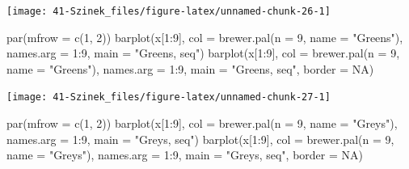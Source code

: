 \documentclass[
]{book}
\newenvironment{Shaded}{\begin{snugshade}}{\end{snugshade}}
\newcommand{\AttributeTok}[1]{\textcolor[rgb]{0.77,0.63,0.00}{#1}}
\newcommand{\ConstantTok}[1]{\textcolor[rgb]{0.00,0.00,0.00}{#1}}
\newcommand{\DecValTok}[1]{\textcolor[rgb]{0.00,0.00,0.81}{#1}}
\newcommand{\FunctionTok}[1]{\textcolor[rgb]{0.00,0.00,0.00}{#1}}
\newcommand{\NormalTok}[1]{#1}
\newcommand{\SpecialCharTok}[1]{\textcolor[rgb]{0.00,0.00,0.00}{#1}}
\newcommand{\StringTok}[1]{\textcolor[rgb]{0.31,0.60,0.02}{#1}}
\begin{document}
\begin{center}\texttt{[image: 41-Szinek\_files/figure-latex/unnamed-chunk-26-1]} \end{center}

\begin{Shaded}
\begin{Highlighting}[]
\FunctionTok{par}\NormalTok{(}\AttributeTok{mfrow =} \FunctionTok{c}\NormalTok{(}\DecValTok{1}\NormalTok{, }\DecValTok{2}\NormalTok{))}
\FunctionTok{barplot}\NormalTok{(x[}\DecValTok{1}\SpecialCharTok{:}\DecValTok{9}\NormalTok{], }\AttributeTok{col =} \FunctionTok{brewer.pal}\NormalTok{(}\AttributeTok{n =} \DecValTok{9}\NormalTok{, }\AttributeTok{name =} \StringTok{"Greens"}\NormalTok{), }\AttributeTok{names.arg =} \DecValTok{1}\SpecialCharTok{:}\DecValTok{9}\NormalTok{, }\AttributeTok{main =} \StringTok{"Greens, seq"}\NormalTok{)}
\FunctionTok{barplot}\NormalTok{(x[}\DecValTok{1}\SpecialCharTok{:}\DecValTok{9}\NormalTok{], }\AttributeTok{col =} \FunctionTok{brewer.pal}\NormalTok{(}\AttributeTok{n =} \DecValTok{9}\NormalTok{, }\AttributeTok{name =} \StringTok{"Greens"}\NormalTok{), }\AttributeTok{names.arg =} \DecValTok{1}\SpecialCharTok{:}\DecValTok{9}\NormalTok{, }\AttributeTok{main =} \StringTok{"Greens, seq"}\NormalTok{, }
    \AttributeTok{border =} \ConstantTok{NA}\NormalTok{)}
\end{Highlighting}
\end{Shaded}

\begin{center}\texttt{[image: 41-Szinek\_files/figure-latex/unnamed-chunk-27-1]} \end{center}

\begin{Shaded}
\begin{Highlighting}[]
\FunctionTok{par}\NormalTok{(}\AttributeTok{mfrow =} \FunctionTok{c}\NormalTok{(}\DecValTok{1}\NormalTok{, }\DecValTok{2}\NormalTok{))}
\FunctionTok{barplot}\NormalTok{(x[}\DecValTok{1}\SpecialCharTok{:}\DecValTok{9}\NormalTok{], }\AttributeTok{col =} \FunctionTok{brewer.pal}\NormalTok{(}\AttributeTok{n =} \DecValTok{9}\NormalTok{, }\AttributeTok{name =} \StringTok{"Greys"}\NormalTok{), }\AttributeTok{names.arg =} \DecValTok{1}\SpecialCharTok{:}\DecValTok{9}\NormalTok{, }\AttributeTok{main =} \StringTok{"Greys, seq"}\NormalTok{)}
\FunctionTok{barplot}\NormalTok{(x[}\DecValTok{1}\SpecialCharTok{:}\DecValTok{9}\NormalTok{], }\AttributeTok{col =} \FunctionTok{brewer.pal}\NormalTok{(}\AttributeTok{n =} \DecValTok{9}\NormalTok{, }\AttributeTok{name =} \StringTok{"Greys"}\NormalTok{), }\AttributeTok{names.arg =} \DecValTok{1}\SpecialCharTok{:}\DecValTok{9}\NormalTok{, }\AttributeTok{main =} \StringTok{"Greys, seq"}\NormalTok{, }
    \AttributeTok{border =} \ConstantTok{NA}\NormalTok{)}
\end{Highlighting}
\end{Shaded}
\end{document}
